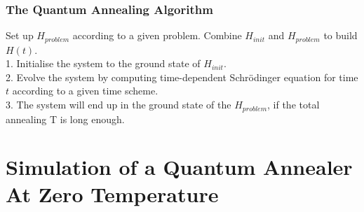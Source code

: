 \documentclass{beamer}
\begin{document}
\begin{frame}
	\frametitle{The Quantum Annealing Algorithm}
	\begin{tcolorbox}[title=Quantum Annealing Algorithm]
		Set up $H_{problem}$ according to a given problem. Combine $H_{init}$ and $H_{problem}$ to build $H(t)$. \\
		
		1. Initialise the system to the ground state of $H_{init}$.\\ %
		
		
		
		2. Evolve the system by computing time-dependent Schrödinger equation for time $t$ according to a given time scheme. \\
		
		3. The system will end up in the ground state of the $H_{problem}$, if the total annealing T is long enough.\\
		
	\end{tcolorbox} 
\end{frame}


\section{Simulation of a Quantum Annealer At Zero Temperature}
\end{document}
